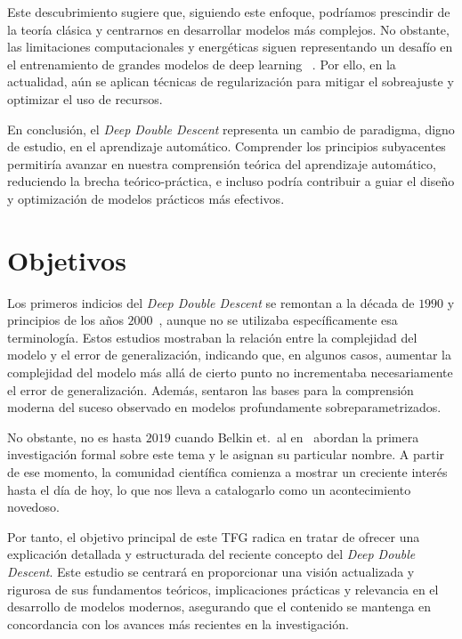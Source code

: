 Este descubrimiento sugiere que, siguiendo este enfoque, podríamos prescindir de la teoría clásica y centrarnos en desarrollar modelos más complejos. No obstante, las limitaciones computacionales y energéticas siguen representando un desafío en el entrenamiento de grandes modelos de deep learning ~\cite{Thompson2022, Cottier2025}. Por ello, en la actualidad, aún se aplican técnicas de regularización para mitigar el sobreajuste y optimizar el uso de recursos.\newline

En conclusión, el \emph{Deep Double Descent} representa un cambio de paradigma, digno de estudio, en el aprendizaje automático. Comprender los principios subyacentes permitiría avanzar en nuestra comprensión teórica del aprendizaje automático, reduciendo la brecha teórico-práctica, e incluso podría contribuir a guiar el diseño y optimización de modelos prácticos más efectivos.\newline

\section{Objetivos}

Los primeros indicios del \textit{Deep Double Descent} se remontan a la década de $1990$ y principios de los años $2000$~\cite{Opper1995,Opper2001}, aunque no se utilizaba específicamente esa terminología. Estos estudios mostraban la relación entre la complejidad del modelo y el error de generalización, indicando que, en algunos casos, aumentar la complejidad del modelo más allá de cierto punto no incrementaba necesariamente el error de generalización. Además, sentaron las bases para la comprensión moderna del suceso observado en modelos profundamente sobreparametrizados.\newline

No obstante, no es hasta $2019$ cuando Belkin et.\ al en~\cite{Belkin2019} abordan la primera investigación formal sobre este tema y le asignan su particular nombre. A partir de ese momento, la comunidad científica comienza a mostrar un creciente interés hasta el día de hoy, lo que nos lleva a catalogarlo como un acontecimiento novedoso.\newline

Por tanto, el objetivo principal de este TFG radica en tratar de ofrecer una explicación detallada y estructurada del reciente concepto del \emph{Deep Double Descent}. Este estudio se centrará en proporcionar una visión actualizada y rigurosa de sus fundamentos teóricos, implicaciones prácticas y relevancia en el desarrollo de modelos modernos, asegurando que el contenido se mantenga en concordancia con los avances más recientes en la investigación.\newline

